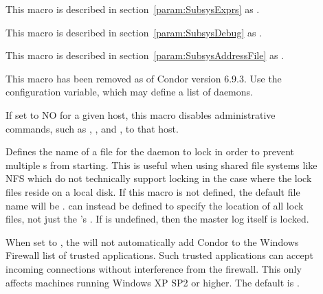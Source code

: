 \begin{description}
\item[] \label{param:MasterExprs} This macro is
  described in section~\ref{param:SubsysExprs} as
  .

\item[] \label{param:MasterDebug} This macro
  is described in section~\ref{param:SubsysDebug} as
  .

\item[] \label{param:MasterAddressFile}
  This macro is described in
  section~\ref{param:SubsysAddressFile} as
  . 

\item[]
  \label{param:SecondaryCollectorList} This macro has been removed
  as of Condor version 6.9.3.
  Use the  configuration variable, which may define a
  list of  daemons.

\item[]
  \label{param:AllowAdminCommands} If set to NO for a given host, this
  macro disables administrative commands, such as 
  , , and , to that host.

\item[] \label{param:MasterInstanceLock}
  Defines the name of a file for the  daemon
  to lock in order to prevent multiple s
  from starting.
  This is useful when using shared file systems like NFS which do
  not technically support locking in the case where the lock files
  reside on a local disk.
  If this macro is not defined, the default file name will be
  .
   can instead be defined to
  specify the location of all lock files, not just the 
  's .
  If  is undefined, then the master log itself is locked.

\item[]
  \label{param:AddWindowsFirewallException} When set to , the
   will not automatically add Condor to the Windows
  Firewall list of trusted applications. Such trusted applications can
  accept incoming connections without interference from the firewall. This
  only affects machines running Windows XP SP2 or higher. The default
  is .


\end{description}
